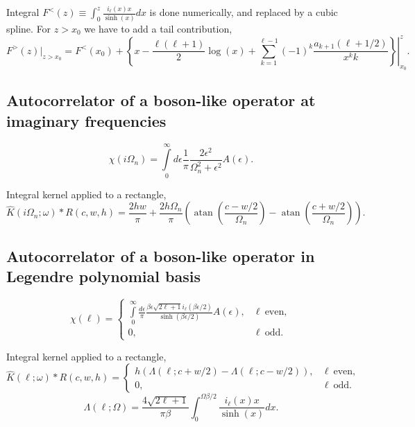 \documentclass[]{article}
\DeclareMathOperator{\atan}{atan}
\begin{document}
Integral $F^<(z) \equiv \int_0^z \frac{i_\ell(x)x}{\sinh(x)} dx$ is done numerically,
and replaced by a cubic spline. For $z>x_0$ we have to add a tail contribution,
\begin{equation}
F^>(z)|_{z>x_0} = F^<(x_0) +
\left.\left\{
x - \frac{\ell(\ell+1)}{2}\log(x) +
\sum_{k=1}^{\ell-1} (-1)^k\frac{a_{k+1}(\ell+1/2)}{x^k k}
\right\}\right|_{x_0}^z.
\end{equation}

\subsection{Autocorrelator of a boson-like operator at imaginary frequencies}
\label{bosonautocorr_imfreq}
\begin{equation}
\chi(i\Omega_n) = \int\limits_0^\infty
d\epsilon \frac{1}{\pi}\frac{2\epsilon^2}{\Omega_n^2+\epsilon^2} A(\epsilon).
\end{equation}

Integral kernel applied to a rectangle,
\begin{equation}
\hat K(i\Omega_n;\omega)*R(c,w,h) = 
\frac{2hw}{\pi} + \frac{2h\Omega_n}{\pi}\left(
\atan\left(\frac{c-w/2}{\Omega_n}\right) - \atan\left(\frac{c+w/2}{\Omega_n}\right)
\right).
\end{equation}

\subsection{Autocorrelator of a boson-like operator in Legendre polynomial basis}
\label{bosonautocorr_legendre}
\begin{equation}
	\chi(\ell) = \left\{
		\begin{array}{ll}
		\int\limits_0^\infty
		\frac{d\epsilon}{\pi}
		\frac{\beta\epsilon\sqrt{2\ell+1} i_{\ell}(\beta\epsilon/2)}
		{\sinh(\beta\epsilon/2)} A(\epsilon), &\ell\ \mathrm{ even},\\
		0, &\ell\ \mathrm{odd}. 
	\end{array}\right.
\end{equation}

Integral kernel applied to a rectangle,
\begin{equation}
	\hat K(\ell;\omega)*R(c,w,h) = \left\{
	\begin{array}{ll}
	h(\Lambda(\ell;c+w/2)-\Lambda(\ell;c-w/2)), &\ell\ \mathrm{ even},\\
	0, &\ell\ \mathrm{odd}. 
	\end{array}\right.	
\end{equation}
\begin{equation}
	\Lambda(\ell;\Omega) =
	\frac{4\sqrt{2\ell+1}}{\pi\beta}
	\int_0^{\Omega\beta/2} \frac{i_\ell(x) x}{\sinh(x)} dx.
\end{equation}
\end{document}
